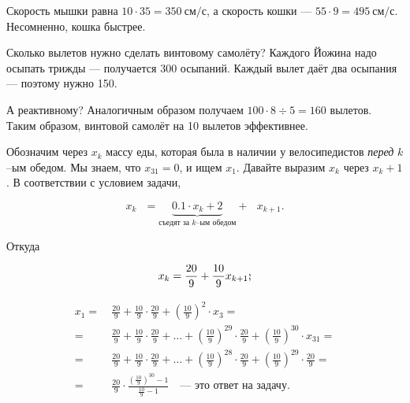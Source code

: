 \begin{itemize}
\itA Скорость мышки равна $10 \cdot 35 = \SI{350}{\text{см}/\text{с}}$, а скорость кошки — $55 \cdot 9 = \SI{495}{\text{см}/\text{с}}$. Несомненно, кошка быстрее.

\itB Сколько вылетов нужно сделать винтовому самолёту? Каждого Йожина надо осыпать трижды — получается 300 осыпаний. Каждый вылет даёт два осыпания — поэтому нужно 150.

\ms А реактивному? Аналогичным образом получаем $100 \cdot 8 \div 5 = 160$ вылетов. Таким образом, винтовой самолёт на 10 вылетов эффективнее.

\itC Обозначим через $x_k$ массу еды, которая была в наличии у велосипедистов {\itshape перед} $k$--ым обедом. Мы знаем, что $x_{31}=0$, и ищем $x_1$. Давайте выразим $x_k$ через $x_k+1$. В соответствии с условием задачи,

$$x_k\ \ \ = \underbrace{0.1 \cdot x_k + 2}_{\text{съедят за $k$--ым обедом}} +\ \ \ x_{k+1}.$$

Откуда

$$x_k = \frac{20}{9} + \frac{10}{9} x_{k+1}\scolon$$

\begin{align*}
x_1 =\ & \frac{20}{9} + \frac{10}{9} \cdot \frac{20}{9} + \left(\frac{10}{9}\right)^2 \cdot x_3 = \\
=\ & \frac{20}{9} + \frac{10}{9} \cdot \frac{20}{9} + \ldots + \left(\frac{10}{9}\right)^{29}
	\cdot\frac{20}{9} + \left(\frac{10}{9}\right)^{30} \cdot x_{31} = \\
=\ & \frac{20}{9} + \frac{10}{9} \cdot \frac{20}{9} + \ldots + \left(\frac{10}{9}\right)^{28}
	\cdot\frac{20}{9} + \left(\frac{10}{9}\right)^{29} \cdot \frac{20}{9} = \\
=\ & \frac{20}{9} \cdot \frac{\left(\tfrac{10}{9}\right)^{30}-1}{\tfrac{10}{9}-1}
	\quad \text{— это ответ на задачу.}
\end{align*}

\end{itemize}